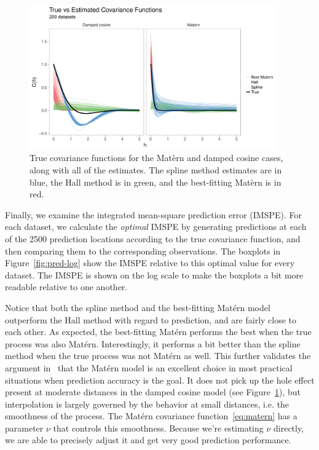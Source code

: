\documentclass[12pt]{article}
\begin{document}
\begin{figure}[htbp]
  \centering
  \includegraphics[width=0.95\textwidth]{true_vs_est_all.pdf}
  \caption{True covariance functions for the Mat\`{e}rn and damped cosine cases, along with all of the estimates. The spline method estimates are in blue, the Hall method is in green, and the best-fitting Mat\`{e}rn is in red.}
  \label{fig:true-vs-est-all}
\end{figure}

Finally, we examine the integrated mean-square prediction error (IMSPE). For each dataset, we calculate the \emph{optimal} IMSPE by generating predictions at each of the 2500 prediction locations according to the true covariance function, and then comparing them to the corresponding observations. The boxplots in Figure~\ref{fig:pred-log} show the IMSPE relative to this optimal value for every dataset. The IMSPE is shown on the log scale to make the boxplots a bit more readable relative to one another.

Notice that both the spline method and the best-fitting Mat\'{e}rn model outperform the Hall method with regard to prediction, and are fairly close to each other. As expected, the best-fitting Mat\'{e}rn performs the best when the true process was also Mat\'{e}rn. Interestingly, it performs a bit better than the spline method when the true process was not Mat\'{e}rn as well. This further validates the argument in~\cite{Stein1999} that the Mat\'{e}rn model is an excellent choice in most practical situations when prediction accuracy is the goal. It does not pick up the hole effect present at moderate distances in the damped cosine model (see Figure~\ref{fig:true-vs-est-all}), but interpolation is largely governed by the behavior at small distances, i.e. the smoothness of the process. The Mat\'{e}rn covariance function~\ref{eq:matern} has a parameter $\nu$ that controls this smoothness. Because we're estimating $\nu$ directly, we are able to precisely adjust it and get very good prediction performance.
\end{document}
